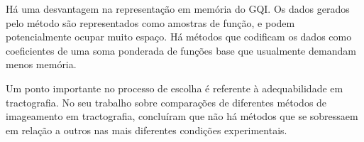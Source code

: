 \documentclass[
    12pt,                %
    oneside,            %
    a4paper,            %
    english,            %
    french,                %
    spanish,            %
    brazil                %
    ]{abntex2}
\begin{document}
Há uma desvantagem na representação em memória do GQI. Os dados gerados pelo método são representados como amostras de função, e podem potencialmente ocupar muito espaço. Há métodos que codificam os dados como coeficientes de uma soma ponderada de funções base \cite{descoteaux2007_QBI, Tournier2004DirectEO, tournier2007} que usualmente demandam menos memória.

Um ponto importante no processo de escolha é referente à adequabilidade em tractografia. No seu trabalho sobre comparações de diferentes métodos de imageamento em tractografia,  concluíram que não há métodos que se sobressaem em relação a outros nas mais diferentes condições experimentais.




























\end{document}

